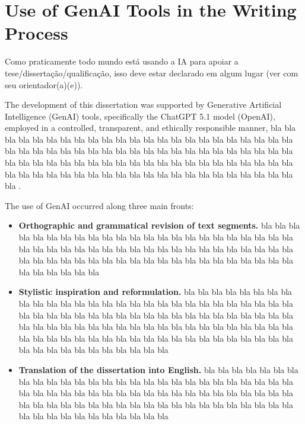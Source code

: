 


\chapter*{Use of GenAI Tools in the Writing Process}

Como praticamente todo mundo está usando a IA para apoiar a tese/dissertação/qualificação, isso deve estar declarado em algum lugar (ver com seu orientador(a)(e)).

The development of this dissertation was supported by Generative Artificial Intelligence (GenAI) tools, specifically the ChatGPT 5.1 model (OpenAI), employed in a controlled, transparent, and ethically responsible manner,  bla bla bla  bla bla bla  bla bla bla  bla bla bla  bla bla bla  bla bla bla  bla bla bla  bla bla bla  bla bla bla  bla bla bla  bla bla bla  bla bla bla  bla bla bla  bla bla bla  bla bla bla  bla bla bla  bla bla bla  bla bla bla  bla bla bla  bla bla bla  bla bla bla  bla bla bla  bla bla bla  bla bla bla  bla bla bla  bla bla bla  bla bla bla  bla bla bla  bla bla bla .

The use of GenAI occurred along three main fronts:

\begin{itemize}
\item \textbf{Orthographic and grammatical revision of text segments.} bla bla bla  bla bla bla  bla bla bla  bla bla bla  bla bla bla  bla bla bla  bla bla bla  bla bla bla  bla bla bla  bla bla bla  bla bla bla  bla bla bla  bla bla bla  bla bla bla  bla bla bla  bla bla bla  bla bla bla  bla bla bla  bla bla bla  bla bla bla  bla bla bla  bla bla bla  bla bla bla 

\item \textbf{Stylistic inspiration and reformulation.}  bla bla bla  bla bla bla  bla bla bla  bla bla bla  bla bla bla  bla bla bla  bla bla bla  bla bla bla  bla bla bla  bla bla bla  bla bla bla  bla bla bla  bla bla bla  bla bla bla  bla bla bla  bla bla bla  bla bla bla  bla bla bla  bla bla bla  bla bla bla  bla bla bla  bla bla bla  bla bla bla  bla bla bla  bla bla bla  bla bla bla  bla bla bla  bla bla bla  bla bla bla  bla bla bla  bla bla bla  bla bla bla  bla bla bla 

\item \textbf{Translation of the dissertation into English.}  bla bla bla  bla bla bla  bla bla bla  bla bla bla  bla bla bla  bla bla bla  bla bla bla  bla bla bla  bla bla bla  bla bla bla  bla bla bla  bla bla bla  bla bla bla  bla bla bla  bla bla bla  bla bla bla  bla bla bla  bla bla bla  bla bla bla  bla bla bla  bla bla bla  bla bla bla  bla bla bla  bla bla bla  bla bla bla  bla bla bla 

\end{itemize}

